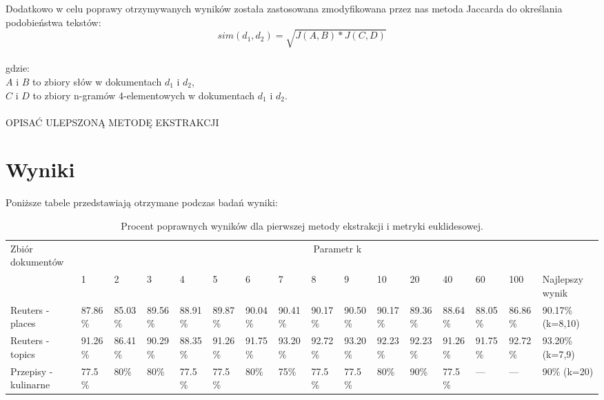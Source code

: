 \documentclass{classrep}
\begin{document}
Dodatkowo w celu poprawy otrzymywanych wyników została zastosowana zmodyfikowana przez nas metoda Jaccarda do określania podobieństwa tekstów: $$sim(d_1, d_2) = \sqrt{J(A ,B)*J(C, D)}$$\\
gdzie:\\
$A$ i $B$ to zbiory słów w dokumentach $d_1$ i $d_2$,\\
$C$ i $D$ to zbiory n-gramów 4-elementowych w dokumentach $d_1$ i $d_2$.

\paragraph{} 
{\color{red}OPISAĆ ULEPSZONĄ METODĘ EKSTRAKCJI}

\section{Wyniki}
Poniższe tabele przedstawiają otrzymane podczas badań wyniki:


\begingroup
{\scriptsize  
\setlength{\LTleft}{-20cm plus -1fill}
\setlength{\LTright}{\LTleft}

\begin{longtable}{|p{1cm}|p{0.7cm}|p{0.7cm}|p{0.7cm}|p{0.7cm}|p{0.7cm}|p{0.7cm}|p{0.7cm}|p{0.7cm}|p{0.7cm}|p{0.7cm}|p{0.7cm}|p{0.7cm}|p{0.7cm}|p{0.7cm}|p{1.1cm}|}
\caption{ Procent poprawnych wyników dla pierwszej metody ekstrakcji i metryki euklidesowej.}\\ 
\hline

Zbiór
dokumentów

 &\multicolumn{15}{c|}{Parametr k}\\
\cline{2-16}
& 1
& 2
& 3
& 4
& 5
& 6
& 7
& 8
& 9
& 10
& 20
& 40
& 60
& 100
& Najlepszy wynik
\\ \hline\hline
Reuters
- places
& 87.86\%	%
& 85.03\%	%
& 89.56\%	%
& 88.91\%	%
& 89.87\%	%
& 90.04\%	%
& 90.41\%	%
& 90.17\%	%
& 90.50\%	%
& 90.17\%	%
& 89.36\%	%
& 88.64\%	%
& 88.05\%	%
& 86.86\%	%
& 90.17\% (k=8,10)
\\ \hline
Reuters
- topics
& 91.26\%	%
& 86.41\%	%
& 90.29\%	%
& 88.35\%	%
& 91.26\%	%
& 91.75\%	%
& 93.20\%	%
& 92.72\%	%
& 93.20\%	%
& 92.23\%	%
& 92.23\%	%
& 91.26\%	%
& 91.75\%	%
& 92.72\%	%
& 93.20\% (k=7,9)
\\ \hline
Przepisy
- kulinarne 
& 77.5\%	%
& 80\%		%
& 80\%		%
& 77.5\%	%
& 77.5\%	%
& 80\%		%
& 75\%		%
& 77.5\%	%
& 77.5\%	%
& 80\%		%
& 90\%		%
& 77.5\%	%
& ---		%
& ---		%
& 90\% (k=20)
\\ \hline
\end{longtable}
}
\endgroup
\end{document}
